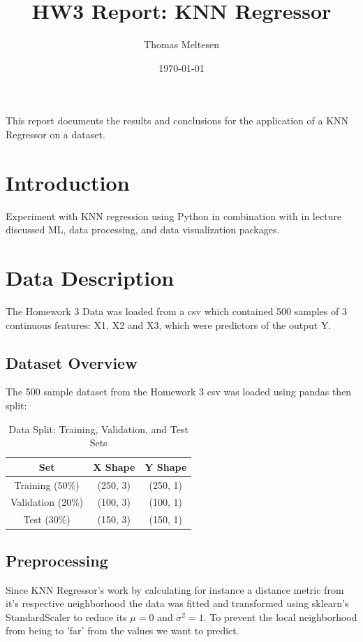 \documentclass[12pt]{article}
\title{HW3 Report: KNN Regressor}
\author{Thomas Meltesen}
\date{\today}
\begin{document}
\maketitle


This report documents the results and conclusions for the application of a KNN Regressor on a dataset.


\section{Introduction}
Experiment with KNN regression using Python in combination with in lecture
discussed ML, data processing, and data visualization packages.

\section{Data Description}
The Homework 3 Data was loaded from a csv which contained 500 samples of 3 continuous features: X1, X2 and X3, which were predictors of the output Y. 


\subsection{Dataset Overview}
The 500 sample dataset from the Homework 3 csv was loaded using pandas then split:
\begin{table}[ht]
\centering
\begin{tabular}{|c|c|c|}
\hline
Set & X Shape & Y Shape \\
\hline
Training (50\%)   & (250, 3) & (250, 1) \\
Validation (20\%) & (100, 3) & (100, 1) \\
Test (30\%)       & (150, 3) & (150, 1) \\
\hline
\end{tabular}
\caption{Data Split: Training, Validation, and Test Sets}
\label{tab:data_split}
\end{table}

\subsection{Preprocessing}
Since KNN Regressor's work by calculating for instance a distance metric from it's respective neighborhood the data was fitted and transformed using sklearn's StandardScaler to reduce its $\mu=0$ and $\sigma^2 = 1$. To prevent the local neighborhood from being to 'far' from the values we want to predict.
\end{document}
